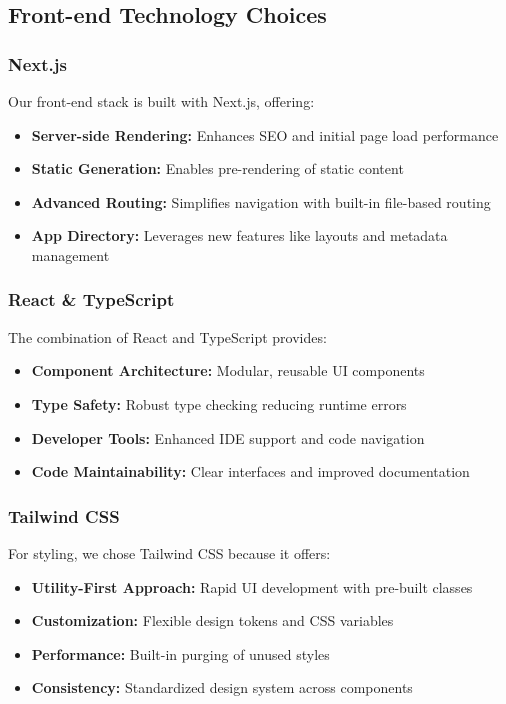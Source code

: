 \subsection{Front-end Technology Choices}

\subsubsection{Next.js}
Our front-end stack is built with Next.js, offering:
\begin{itemize}
    \item \textbf{Server-side Rendering:} Enhances SEO and initial page load performance
    \item \textbf{Static Generation:} Enables pre-rendering of static content
    \item \textbf{Advanced Routing:} Simplifies navigation with built-in file-based routing
    \item \textbf{App Directory:} Leverages new features like layouts and metadata management
\end{itemize}

\subsubsection{React \& TypeScript}
The combination of React and TypeScript provides:
\begin{itemize}
    \item \textbf{Component Architecture:} Modular, reusable UI components
    \item \textbf{Type Safety:} Robust type checking reducing runtime errors
    \item \textbf{Developer Tools:} Enhanced IDE support and code navigation
    \item \textbf{Code Maintainability:} Clear interfaces and improved documentation
\end{itemize}

\subsubsection{Tailwind CSS}
For styling, we chose Tailwind CSS because it offers:
\begin{itemize}
    \item \textbf{Utility-First Approach:} Rapid UI development with pre-built classes
    \item \textbf{Customization:} Flexible design tokens and CSS variables
    \item \textbf{Performance:} Built-in purging of unused styles
    \item \textbf{Consistency:} Standardized design system across components
\end{itemize}

